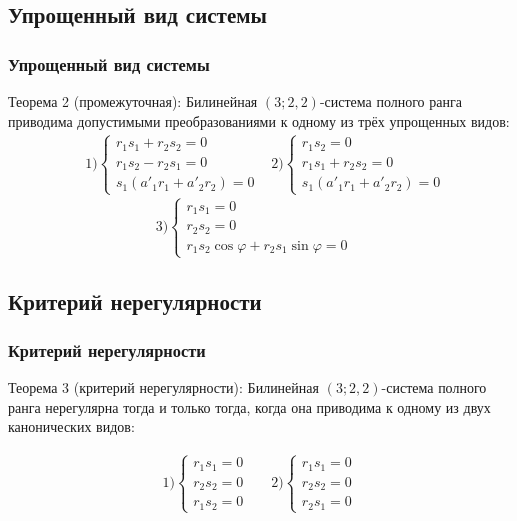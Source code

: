 \documentclass[russian,hyperref={unicode}]{beamer}
\begin{document}
\subsection{Упрощенный вид системы}
\frame
{
	\frametitle{Упрощенный вид системы}
	\begin{block}{Теорема 2 (промежуточная):}
	Билинейная $(3; 2, 2)$-система полного ранга приводима допустимыми 
	преобразованиями к одному из трёх упрощенных видов: 
	\begin{align*}
		&
		1)\begin{cases}
			r_1 s_1 + r_2 s_2 = 0 \\ 
			r_1 s_2 - r_2 s_1 = 0 \\ 
			s_1 (a'_{1} r_1 + a'_{2} r_2) = 0
		\end{cases}
		&
		2)\begin{cases}
			r_1 s_2 = 0 \\
			r_1 s_1 + r_2 s_2 = 0 \\
			s_1 (a'_{1} r_1 + a'_{2} r_2) = 0
		\end{cases} 
	\end{align*}
	$$
		3)\begin{cases}
		 	r_1 s_1 = 0 \\
		 	r_2 s_2 = 0 \\
		 	r_1 s_2 \cos \varphi + r_2 s_1 \sin \varphi = 0 &
		\end{cases}
	$$
	\end{block}
}
\subsection{Критерий нерегулярности}
\frame
{
	\frametitle{Критерий нерегулярности}
	\begin{block}{Теорема 3 (критерий нерегулярности):}
	Билинейная $(3;2,2)$-система полного ранга нерегулярна тогда и только тогда, когда 
	она приводима к одному из двух канонических видов:
	
	\begin{align*}
		&
		1)\begin{cases}
		 	r_1 s_1 = 0 \\
		 	r_2 s_2 = 0 \\
		 	r_1 s_2 = 0 &
		\end{cases}
		&
		2)\begin{cases}
			r_1 s_1 = 0 \\
		 	r_2 s_2 = 0 \\
		 	r_2 s_1 = 0 &
		\end{cases}
	\end{align*}
	\end{block}
}
\end{document}
